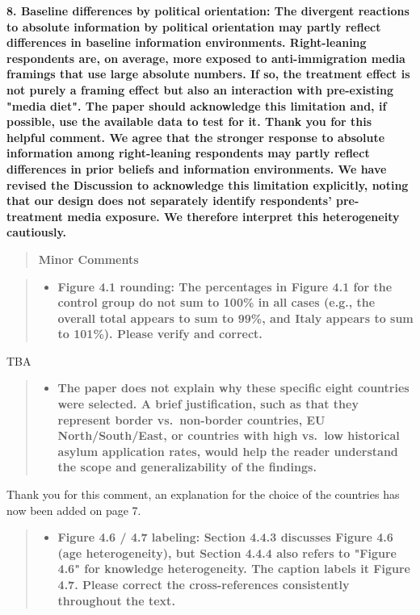 \documentclass[
  11pt,
]{article}
\providecommand{\tightlist}{%
  \setlength{\itemsep}{0pt}\setlength{\parskip}{0pt}}
\begin{document}
\textbf{8. Baseline differences by political orientation: The divergent reactions to absolute information by political orientation may partly reflect differences in baseline information environments. Right-leaning respondents are, on average, more exposed to anti-immigration media framings that use large absolute numbers. If so, the treatment effect is not purely a framing effect but also an interaction with pre-existing "media diet". The paper should acknowledge this limitation and, if possible, use the available data to test for it. Thank you for this helpful comment. We agree that the stronger response to absolute information among right-leaning respondents may partly reflect differences in prior beliefs and information environments. We have revised the Discussion to acknowledge this limitation explicitly, noting that our design does not separately identify respondents' pre-treatment media exposure. We therefore interpret this heterogeneity cautiously.}

\begin{quote}
\textbf{Minor Comments}
\end{quote}

\begin{quote}
\begin{itemize}
\tightlist
\item
  \textbf{Figure 4.1 rounding: The percentages in Figure 4.1 for the control group do not sum to 100\% in all cases (e.g., the overall total appears to sum to 99\%, and Italy appears to sum to 101\%). Please verify and correct.}
\end{itemize}
\end{quote}

TBA

\begin{quote}
\begin{itemize}
\tightlist
\item
  \textbf{The paper does not explain why these specific eight countries were selected. A brief justification, such as that they represent border vs.~non-border countries, EU North/South/East, or countries with high vs.~low historical asylum application rates, would help the reader understand the scope and generalizability of the findings.}
\end{itemize}
\end{quote}

Thank you for this comment, an explanation for the choice of the
countries has now been added on page 7.

\begin{quote}
\begin{itemize}
\tightlist
\item
  \textbf{Figure 4.6 / 4.7 labeling: Section 4.4.3 discusses Figure 4.6 (age heterogeneity), but Section 4.4.4 also refers to "Figure 4.6" for knowledge heterogeneity. The caption labels it Figure 4.7. Please correct the cross-references consistently throughout the text.}
\end{itemize}
\end{quote}
\end{document}
